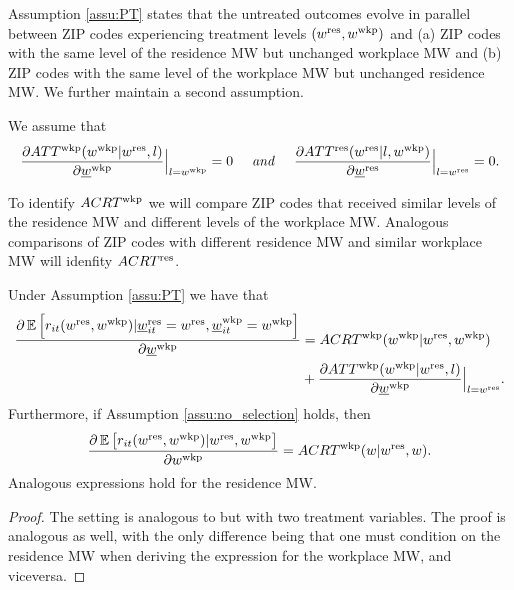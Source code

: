 Assumption \ref{assu:PT} states that the untreated outcomes evolve in parallel 
between ZIP codes experiencing treatment levels $(w^{\text{res}},w^{\text{wkp}})$ and 
(a) ZIP codes with the same level of the residence MW but unchanged workplace MW and
(b) ZIP codes with the same level of the workplace MW but unchanged residence MW.
We further maintain a second assumption.

\begin{assu} \label{assu:no_selection}
    We assume that
    \begin{equation*}\label{eq:no_selection_workplace}
        \frac{\partial ATT^{\text{wkp}}(w^{\text{wkp}} | w^{\text{res}}, l)}
             {\partial \underline{w}^{\text{wkp}}} \Big|_{l = w^{\text{wkp}}} = 0
        \quad\text{\textit{ and }}\quad
        \frac{\partial ATT^{\text{res}}(w^{\text{res}} | l, w^{\text{wkp}})}
             {\partial \underline{w}^{\text{res}}} \Big|_{l = w^{\text{res}}} = 0 .
    \end{equation*}
\end{assu}

To identify $ACRT^{\text{wkp}}$ we will compare ZIP codes that received similar levels 
of the residence MW and different levels of the workplace MW.
Analogous comparisons of ZIP codes with different residence MW and similar 
workplace MW will idenfity $ACRT^{\text{res}}$.

\begin{prop}[Identification]\label{prop:PO_identification}
    Under Assumption \ref{assu:PT} we have that
    \begin{equation*}
        \begin{split}
        \frac{\partial \operatorname{\mathbb{E}}\left[r_{it}(w^{\text{res}}, w^{\text{wkp}}) 
                              | \underline{w}_{it}^{\text{res}}=w^{\text{res}}, \underline{w}_{it}^{\text{wkp}}=w^{\text{wkp}}\right]}
             {\partial \underline{w}^{\text{wkp}}} 
        & = ACRT^{\text{wkp}}(w^{\text{wkp}} | w^{\text{res}}, w^{\text{wkp}})            \\
        &  + \frac{\partial ATT^{\text{wkp}}(w^{\text{wkp}} | w^{\text{res}}, l)}
                  {\partial \underline{w}^{\text{wkp}}} \Big|_{l = w^{\text{res}}} .    \\
        \end{split}
    \end{equation*}
    Furthermore, if Assumption \ref{assu:no_selection} holds, then
    \begin{equation*}
        \frac{\partial \operatorname{\mathbb{E}}\left[r_{it}(w^{\text{res}}, w^{\text{wkp}}) | w^{\text{res}}, w^{\text{wkp}}\right]}
        {\partial w^{\text{wkp}}} 
       = ACRT^{\text{wkp}}(w | w^{\text{res}}, w) .
    \end{equation*}
    Analogous expressions hold for the residence MW.
\end{prop}
\begin{proof}
    The setting is analogous to \textcite{CallawayEtAl2021} but with two 
    treatment variables.
    The proof is analogous as well, with the only difference being that one 
    must condition on the residence MW when deriving the expression for the 
    workplace MW, and viceversa.
\end{proof}

